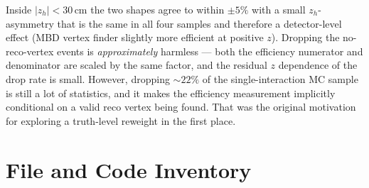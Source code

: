 \documentclass[11pt,a4paper]{article}
\begin{document}
Inside $|z_h|<30$\,cm the two shapes agree to within $\pm 5\%$ with
a small $z_h$-asymmetry that is the same in all four samples and
therefore a detector-level effect (MBD vertex finder slightly more
efficient at positive $z$). Dropping the no-reco-vertex events is
\emph{approximately} harmless --- both the efficiency numerator and
denominator are scaled by the same factor, and the residual $z$
dependence of the drop rate is small. However, dropping $\sim\!22\%$
of the single-interaction MC sample is still a lot of statistics,
and it makes the efficiency measurement implicitly conditional on a
valid reco vertex being found. That was the original motivation for
exploring a truth-level reweight in the first place.


\section{File and Code Inventory}
\label{app:code}
\end{document}
